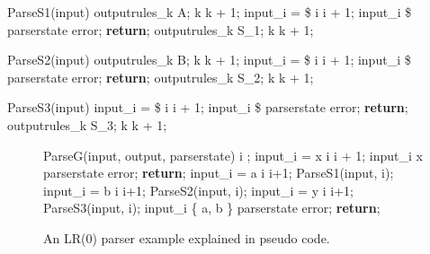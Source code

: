 \documentclass[11pt]{article}
\begin{document}
\begin{center}
\begin{gcl}
\PROC ParseS1(input)
outputrules_k \becomes A;
k \becomes k + 1;
\IF input_i = \$ \rightarrow 
                 \qquad i \becomes i + 1;
\BAR input_i \neq \$ \rightarrow 
                 \qquad parserstate \becomes error;
                 \qquad \textbf{return};
\FI
outputrules_k \becomes S_1;
k \becomes k + 1;
\CORP
\end{gcl}
\end{center}

\begin{center}
\begin{gcl}
\PROC ParseS2(input)
outputrules_k \becomes B;
k \becomes k + 1;
\IF input_i = \$ \rightarrow i \becomes i + 1;
\BAR input_i \neq \$ \rightarrow
                 \qquad parserstate \becomes error;
                 \qquad \textbf{return};
\FI
outputrules_k \becomes S_2;
k \becomes k + 1;
\CORP
\end{gcl}
\end{center}

\begin{center}
\begin{gcl}
\PROC ParseS3(input)
\IF input_i = \$ \rightarrow i \becomes i + 1;
\BAR input_i \neq \$ \rightarrow 
                 \qquad parserstate \becomes error;
                 \qquad \textbf{return};
\FI
outputrules_k \becomes S_3;
k \becomes k + 1;
\CORP
\end{gcl}
\end{center}

\begin{figure}[!h]
\begin{center}
\begin{gcl}
\PROC ParseG(input, output, parserstate)
i ;
\IF input_i = x \rightarrow i \becomes i + 1;
\BAR input_i \neq x \rightarrow 
                \qquad parserstate \becomes error;
                \qquad \textbf{return};
\FI
\IF input_i = a \rightarrow
                \qquad i \becomes i+1;
                \qquad ParseS1(input, i);
\BAR input_i = b \rightarrow 
                \qquad i \becomes i+1;
                \qquad ParseS2(input, i);
\BAR input_i = y \rightarrow 
                \qquad i \becomes i+1;
                \qquad ParseS3(input, i);
\BAR input_i \notin \{ a, b \} \rightarrow 
                \qquad parserstate \becomes error; 
                \qquad \textbf{return};
\FI
\CORP
\end{gcl}
\caption{An LR(0) parser example explained in pseudo code.}
\end{center}
\end{figure}
\end{document}
